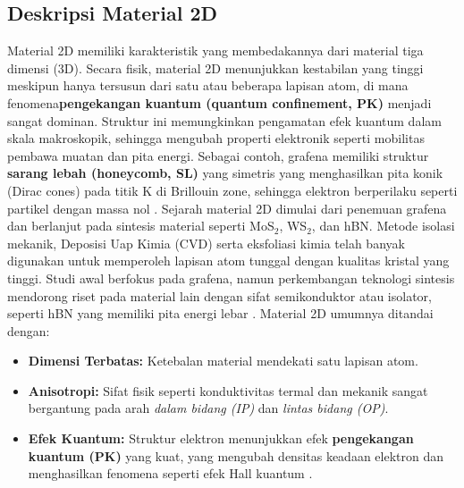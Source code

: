 \subsection{Deskripsi Material 2D}
Material 2D memiliki karakteristik yang membedakannya dari material tiga dimensi (3D).
Secara fisik, material 2D menunjukkan kestabilan yang tinggi meskipun hanya tersusun dari satu atau beberapa lapisan atom, di mana fenomena\textbf{pengekangan kuantum (quantum confinement, PK)} menjadi sangat dominan.
Struktur ini memungkinkan pengamatan efek kuantum dalam skala makroskopik, sehingga mengubah properti elektronik seperti mobilitas pembawa muatan dan pita energi.
Sebagai contoh, grafena memiliki struktur \textbf{sarang lebah (honeycomb, SL)} yang simetris yang menghasilkan pita konik (Dirac cones) pada titik K di Brillouin zone, sehingga elektron berperilaku seperti partikel dengan massa nol \citep{CastroNeto2009}.
Sejarah material 2D dimulai dari penemuan grafena dan berlanjut pada sintesis material seperti MoS\(_2\), WS\(_2\), dan hBN.
Metode isolasi mekanik, Deposisi Uap Kimia (CVD) serta eksfoliasi kimia telah banyak digunakan untuk memperoleh lapisan atom tunggal dengan kualitas kristal yang tinggi.
Studi awal berfokus pada grafena, namun perkembangan teknologi sintesis mendorong riset pada material lain dengan sifat semikonduktor atau isolator, seperti hBN yang memiliki pita energi lebar \citep{Geim2013}.
Material 2D umumnya ditandai dengan:
\begin{itemize}
    \item \textbf{Dimensi Terbatas:} Ketebalan material mendekati satu lapisan atom.
    \item \textbf{Anisotropi:} Sifat fisik seperti konduktivitas termal dan mekanik sangat bergantung pada arah \emph{dalam bidang (IP)} dan \emph{lintas bidang (OP)}.
    \item \textbf{Efek Kuantum:} Struktur elektron menunjukkan efek \textbf{pengekangan kuantum (PK)} yang kuat, yang mengubah densitas keadaan elektron dan menghasilkan fenomena seperti efek Hall kuantum \citep{Das2015}.
\end{itemize}

